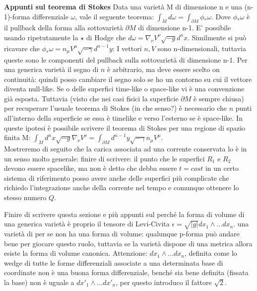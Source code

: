 \documentclass[10pt,a4paper]{article}
\begin{document}
\textbf{Appunti sul teorema di Stokes}
Data una varietà M di dimensione n e una (n-1)-forma differenziale $\omega$, vale il seguente teorema: $\int_{M} d \omega = \int_{\partial M} \phi_{*} \omega$. Dove $\phi_{*} \omega$ è il pullback della forma alla sottovarietà $\partial M$ di dimensione n-1. E' possibile usando ripetutamente la $\star$ di Hodge che $d \omega = \nabla_{\nu} V^{\nu} \sqrt{-g} d^n x$. Similmente si può ricavare che $\phi_{*} \omega = n_{\mu} V^{\mu} \sqrt{-\gamma} d^{n-1}y$: I vettori $n, V$ sono n-dimensionali, tuttavia queste sono le componenti del pullback sulla sottovarietà di dimensione n-1. Per una generica varietà il segno di $n$ è arbitrario, ma deve essere scelto on continuità: quindi posso cambiare il segno solo se ho un contorno su cui il vettore diventa null-like. Se o delle superfici time-like o space-like vi è una convenzione già esposta. Tuttavia (visto che nei casi fisici la superficie $\partial M$ è sempre chiusa) per recuperare l'usuale teorema di Stokes (in che senso?) è necessario che $n$ punti all'interno della superficie se essa è timelike e verso l'esterno se è space-like. In queste ipotesi è possibile scrivere il teorema di Stokes per una regione di spazio finita M: $\int_M d^n x \sqrt{-g} \nabla_{\nu} V^{\nu} = \int_{\partial M} d^{n-1} y \sqrt{-\gamma} n_{\mu} V^{\mu}$.\\
Mostreremo di seguito che la carica associata ad una corrente conservata lo è in un senso molto generale: finire di scrivere: il punto  che le superfici $R_1$ e $R_2$ devono essere spacelike, ma non è detto che debba essere $t=cost$ in un certo sistema di riferimento posso avere anche delle superfici più complicate che richiedo l'integrazione anche della corrente nel tempo e comunque ottenere lo stesso numero $Q$.

Finire di scrivere questa sezione e più appunti sul perché la forma di volume di una generica varietà è proprio il tensore di Levi-Civita $\epsilon = \sqrt{|g|} dx_1 \wedge ... dx_n$. una varietà di per se non ha una forma di volume: qualunque p-forma può andare bene per giocare questo ruolo, tuttavia se la varietà dispone di una metrica allora esiste la forma di volume  canonica. Attenzione: $dx_1 \wedge ... dx_n$, definita come lo wedge di tutte le forme differenziali associate a una determinata base di coordinate non è una buona forma differenziale, benché sia bene definita (fissata la base) non è uguale a $dx'_1 \wedge ... dx'_n$, per questo introduco il fattore $\sqrt{2}$.
\end{document}
